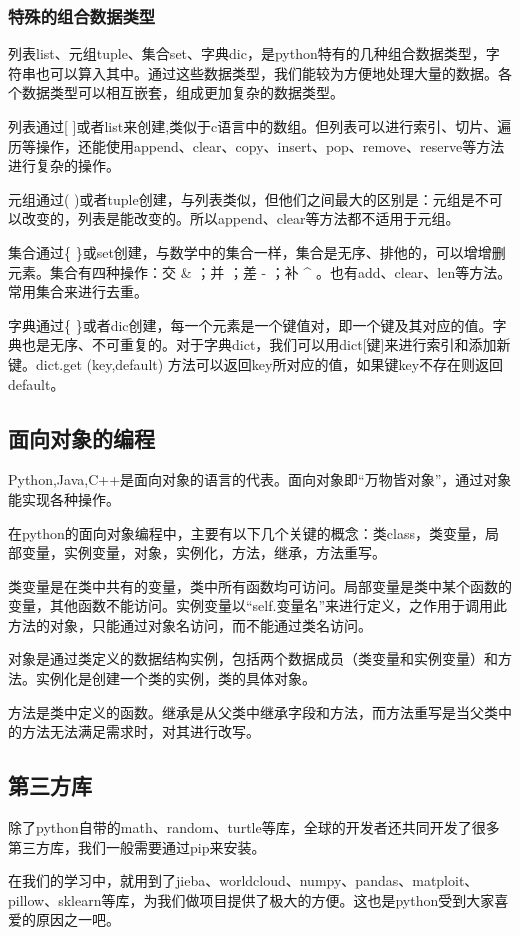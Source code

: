 \documentclass[UTF8]{ctexart}
\begin{document}
  \subsubsection{特殊的组合数据类型}
  列表list、元组tuple、集合set、字典dic，是python特有的几种组合数据类型，字符串也可以算入其中。通过这些数据类型，我们能较为方便地处理大量的数据。各个数据类型可以相互嵌套，组成更加复杂的数据类型。
  \par
  列表通过[ ]或者list来创建,类似于c语言中的数组。但列表可以进行索引、切片、遍历等操作，还能使用append、clear、copy、insert、pop、remove、reserve等方法进行复杂的操作。
  \par
  元组通过( )或者tuple创建，与列表类似，但他们之间最大的区别是：元组是不可以改变的，列表是能改变的。所以append、clear等方法都不适用于元组。
  \par
  集合通过\{ \}或set创建，与数学中的集合一样，集合是无序、排他的，可以增增删元素。集合有四种操作：交 \& ；并 \textbar ；差 - ；补 \^{} 。也有add、clear、len等方法。常用集合来进行去重。
  \par
  字典通过\{ \}或者dic创建，每一个元素是一个键值对，即一个键及其对应的值。字典也是无序、不可重复的。对于字典dict，我们可以用dict[键]来进行索引和添加新键。dict.get (key,default) 方法可以返回key所对应的值，如果键key不存在则返回default。
  \subsection{面向对象的编程}
  Python,Java,C++是面向对象的语言的代表。面向对象即“万物皆对象”，通过对象能实现各种操作。\par
  在python的面向对象编程中，主要有以下几个关键的概念：类class，类变量，局部变量，实例变量，对象，实例化，方法，继承，方法重写。\par
  类变量是在类中共有的变量，类中所有函数均可访问。局部变量是类中某个函数的变量，其他函数不能访问。实例变量以“self.变量名”来进行定义，之作用于调用此方法的对象，只能通过对象名访问，而不能通过类名访问。\par
  对象是通过类定义的数据结构实例，包括两个数据成员（类变量和实例变量）和方法。实例化是创建一个类的实例，类的具体对象。\par
  方法是类中定义的函数。继承是从父类中继承字段和方法，而方法重写是当父类中的方法无法满足需求时，对其进行改写。
  \subsection{第三方库}
  除了python自带的math、random、turtle等库，全球的开发者还共同开发了很多第三方库，我们一般需要通过pip来安装。\par 
  在我们的学习中，就用到了jieba、worldcloud、numpy、pandas、matploit、pillow、sklearn等库，为我们做项目提供了极大的方便。这也是python受到大家喜爱的原因之一吧。
  \newpage
\end{document}
